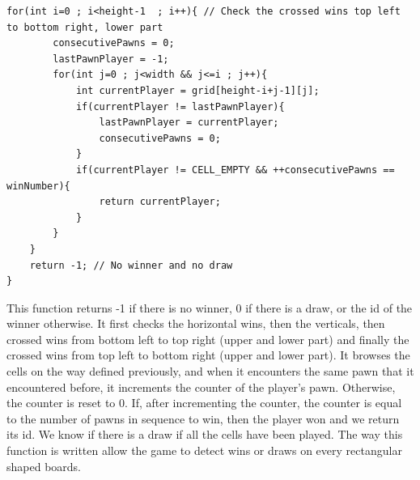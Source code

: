 \documentclass[10pt, a4paper]{article}
\begin{document}
\begin{lstlisting}[caption = Win detection]
	for(int i=0 ; i<height-1  ; i++){ // Check the crossed wins top left to bottom right, lower part
		consecutivePawns = 0;
		lastPawnPlayer = -1;
		for(int j=0 ; j<width && j<=i ; j++){
			int currentPlayer = grid[height-i+j-1][j];
			if(currentPlayer != lastPawnPlayer){
				lastPawnPlayer = currentPlayer;
				consecutivePawns = 0;
			}	
			if(currentPlayer != CELL_EMPTY && ++consecutivePawns == winNumber){
				return currentPlayer;
			}
		}
	}
	return -1; // No winner and no draw
}
\end{lstlisting}
This function returns -1 if there is no winner, 0 if there is a draw, or the id of the winner otherwise.
It first checks the horizontal wins, then the verticals, then crossed wins from bottom left to top right (upper and lower part) and finally the crossed wins from top left to bottom right (upper and lower part).
It browses the cells on the way defined previously, and when it encounters the same pawn that it encountered before, it increments the counter of the player's pawn. Otherwise, the counter is reset to 0. If, after incrementing the counter, the counter is equal to the number of pawns in sequence to win, then the player won and we return its id.
We know if there is a draw if all the cells have been played.
The way this function is written allow the game to detect wins or draws on every rectangular shaped boards.
\end{document}

